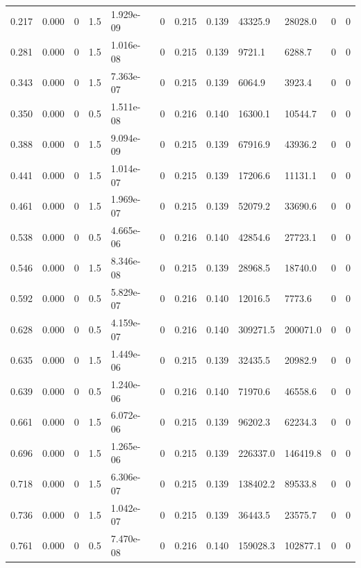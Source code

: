 \documentclass[preview]{standalone}
\begin{document}
{{\begin{tabular}{L{1.2cm}C{1.2cm} C{0.3cm}C{0.5cm} C{1.4cm}C{1.4cm} C{1.4cm}C{1.4cm} C{1.6cm}C{1.6cm} C{1.6cm}C{1.6cm}}
  0.217  &  0.000  & 0     & 1.5 &  1.929e-09  & 0  &  0.215&   0.139& 43325.9 & 28028.0   &  0 & 0  \\ 
  0.281  &  0.000  & 0     & 1.5 &  1.016e-08  & 0  &  0.215&   0.139& 9721.1 & 6288.7   &  0 & 0  \\ 
  0.343  &  0.000  & 0     & 1.5 &  7.363e-07  & 0  &  0.215&   0.139& 6064.9 & 3923.4   &  0 & 0  \\ 
  0.350  &  0.000  & 0     & 0.5 &  1.511e-08  & 0  &  0.216&   0.140& 16300.1 & 10544.7   &  0 & 0  \\ 
  0.388  &  0.000  & 0     & 1.5 &  9.094e-09  & 0  &  0.215&   0.139& 67916.9 & 43936.2   &  0 & 0  \\ 
  0.441  &  0.000  & 0     & 1.5 &  1.014e-07  & 0  &  0.215&   0.139& 17206.6 & 11131.1   &  0 & 0  \\ 
  0.461  &  0.000  & 0     & 1.5 &  1.969e-07  & 0  &  0.215&   0.139& 52079.2 & 33690.6   &  0 & 0  \\ 
  0.538  &  0.000  & 0     & 0.5 &  4.665e-06  & 0  &  0.216&   0.140& 42854.6 & 27723.1   &  0 & 0  \\ 
  0.546  &  0.000  & 0     & 1.5 &  8.346e-08  & 0  &  0.215&   0.139& 28968.5 & 18740.0   &  0 & 0  \\ 
  0.592  &  0.000  & 0     & 0.5 &  5.829e-07  & 0  &  0.216&   0.140& 12016.5 & 7773.6   &  0 & 0  \\ 
  0.628  &  0.000  & 0     & 0.5 &  4.159e-07  & 0  &  0.216&   0.140& 309271.5 & 200071.0   &  0 & 0  \\ 
  0.635  &  0.000  & 0     & 1.5 &  1.449e-06  & 0  &  0.215&   0.139& 32435.5 & 20982.9   &  0 & 0  \\ 
  0.639  &  0.000  & 0     & 0.5 &  1.240e-06  & 0  &  0.216&   0.140& 71970.6 & 46558.6   &  0 & 0  \\ 
  0.661  &  0.000  & 0     & 1.5 &  6.072e-06  & 0  &  0.215&   0.139& 96202.3 & 62234.3   &  0 & 0  \\ 
  0.696  &  0.000  & 0     & 1.5 &  1.265e-06  & 0  &  0.215&   0.139& 226337.0 & 146419.8   &  0 & 0  \\ 
  0.718  &  0.000  & 0     & 1.5 &  6.306e-07  & 0  &  0.215&   0.139& 138402.2 & 89533.8   &  0 & 0  \\ 
  0.736  &  0.000  & 0     & 1.5 &  1.042e-07  & 0  &  0.215&   0.139& 36443.5 & 23575.7   &  0 & 0  \\ 
  0.761  &  0.000  & 0     & 0.5 &  7.470e-08  & 0  &  0.216&   0.140& 159028.3 & 102877.1   &  0 & 0  \\ 

\end{tabular}}}
\end{document}
